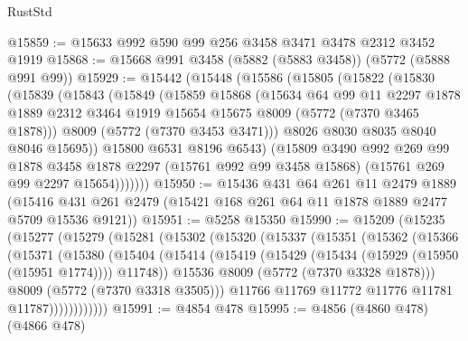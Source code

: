 \begin{lexlean}{RustStd}
\begin{coremodule}
@15859 := @15633 @992 @590 @99 @256 @3458 @3471 @3478 @2312 @3452 @1919
@15868 := @15668 @991 @3458 (@5882 (@5883 @3458)) (@5772 (@5888 @991 @99))
@15929 := @15442
    (@15448
      (@15586
        (@15805
          (@15822
            (@15830
              (@15839
                (@15843
                  (@15849
                    (@15859
                      @15868
                      (@15634
                        @64
                        @99
                        @11
                        @2297
                        @1878
                        @1889
                        @2312
                        @3464
                        @1919
                        @15654
                        @15675
                        @8009
                        (@5772 (@7370 @3465 @1878)))
                      @8009
                      (@5772 (@7370 @3453 @3471)))
                    @8026
                    @8030
                    @8035
                    @8040
                    @8046
                    @15695))
                @15800
                @6531
                @8196
                @6543)
              (@15809
                @3490
                @992
                @269
                @99
                @1878
                @3458
                @1878
                @2297
                (@15761 @992 @99 @3458 @15868)
                (@15761 @269 @99 @2297 @15654)))))))
@15950 := @15436
    @431
    @64
    @261
    @11
    @2479
    @1889
    (@15416 @431 @261 @2479 (@15421 @168 @261 @64 @11 @1878 @1889 @2477 @5709 @15536 @9121))
@15951 := @5258 @15350
@15990 := @15209
    (@15235
      (@15277
        (@15279
          (@15281
            (@15302
              (@15320
                (@15337
                  (@15351
                    (@15362
                      (@15366
                        (@15371
                          (@15380
                            (@15404
                              (@15414
                                (@15419 (@15429 (@15434 (@15929 (@15950 (@15951 @1774)))) @11748))
                                @15536
                                @8009
                                (@5772 (@7370 @3328 @1878)))
                              @8009
                              (@5772 (@7370 @3318 @3505)))
                            @11766
                            @11769
                            @11772
                            @11776
                            @11781
                            @11787))))))))))))
@15991 := @4854 @478
@15995 := @4856 (@4860 @478) (@4866 @478)

\end{coremodule}
\end{lexlean}
